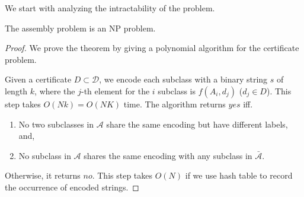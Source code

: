 \documentclass[sigplan,10pt,review]{acmart}\settopmatter{printfolios=true,printccs=false,printacmref=false}
\begin{document}
We start with analyzing the intractability of the problem.
\begin{theorem}
	The assembly problem is an NP problem.
\end{theorem}
\begin{proof}
We prove the theorem by giving a polynomial algorithm for the certificate problem.

Given a certificate $D \subset \mathcal{D}$, we encode each subclass with a binary string $s$ of length $k$, where the $j$-th element for the $i$ subclass is $f(A_i, d_j)$ ($d_j \in D$).
This step takes $O(Nk) = O(NK)$ time.
The algorithm returns $yes$ iff. \begin{enumerate}
	\item No two subclasses in $\mathcal{A}$ share the same encoding but have different labels, and,
	\item No subclass in $\mathcal{A}$ shares the same encoding with any subclass in $\bar{\mathcal{A}}$.
\end{enumerate}
Otherwise, it returns $no$.
This step takes $O(N)$ if we use hash table to record the occurrence of encoded strings.



\end{proof}
\end{document}
